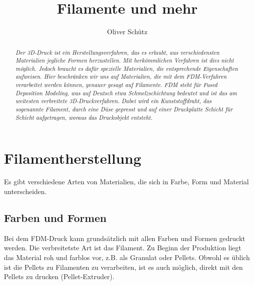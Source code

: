 \documentclass[10pt]{article}
\title{Filamente und mehr}
\author{Oliver Schütz}
\begin{document}
    \maketitle
    \tableofcontents

    \newpage
    \begin{abstract}
\textit{Der 3D-Druck ist ein Herstellungsverfahren, das es erlaubt, aus verschiedensten Materialien jegliche Formen herzustellen.
Mit herkömmlichen Verfahren ist dies nicht möglich.
Jedoch braucht es dafür spezielle Materialien, die entsprechende Eigenschaften aufweisen.
Hier beschränken wir uns auf Materialien, die mit dem FDM-Verfahren verarbeitet werden können, genauer gesagt auf Filamente.
FDM steht für Fused Deposition Modeling, was auf Deutsch etwa Schmelzschichtung bedeutet und ist das am weitesten verbreitete 3D-Druckverfahren.
Dabei wird ein Kunststoffdraht, das sogenannte Filament, durch eine Düse gepresst und auf einer Druckplatte Schicht für Schicht aufgetragen, woraus das Druckobjekt entsteht.
}
    \end{abstract}

    \section{Filamentherstellung}
    Es gibt verschiedene Arten von Materialien, die sich in Farbe, Form und Material unterscheiden.

    \subsection{Farben und Formen}
    Bei dem FDM-Druck kann grundsätzlich mit allen Farben und Formen gedruckt werden.
    Die verbreitetste Art ist das Filament.
    Zu Beginn der Produktion liegt das Material roh und farblos vor, z.B. als Granulat oder Pellets.
    Obwohl es üblich ist die Pellets zu Filamenten zu verarbeiten, ist es auch möglich, direkt mit den Pellets zu drucken (Pellet-Extruder).
\end{document}

